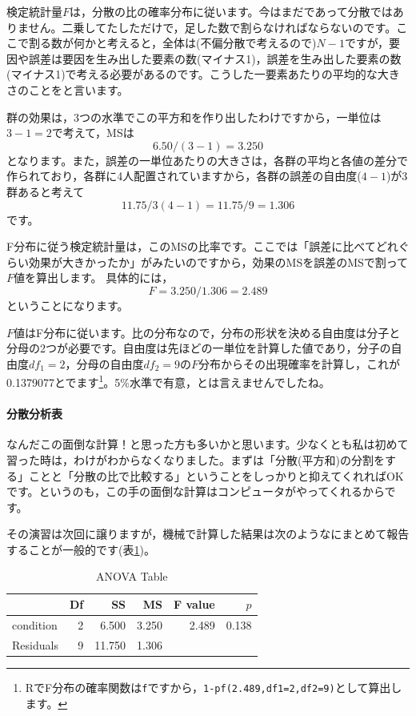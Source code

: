 \documentclass{ltjbook}
\begin{document}
検定統計量$F$は，分散の比の確率分布に従います。今はまだであって分散ではありません。二乗してたしただけで，足した数で割らなければならないのです。ここで割る数が何かと考えると，全体は(不偏分散で考えるので)$N-1$ですが，要因や誤差は要因を生み出した要素の数(マイナス1)，誤差を生み出した要素の数(マイナス1)で考える必要があるのです。こうした一要素あたりの平均的な大きさのことをと言います。

群の効果は，3つの水準でこの平方和を作り出したわけですから，一単位は$3-1=2$で考えて，MSは
\[ 6.50 / (3-1) = 3.250\]
となります。また，誤差の一単位あたりの大きさは，各群の平均と各値の差分で作られており，各群に4人配置されていますから，各群の誤差の自由度($4-1$)が3群あると考えて
\[ 11.75/3(4-1)=11.75/9 = 1.306\]
です。

F分布に従う検定統計量は，このMSの比率です。ここでは「誤差に比べてどれぐらい効果が大きかったか」がみたいのですから，効果のMSを誤差のMSで割って$F$値を算出します。
具体的には，
\[F = 3.250/1.306 = 2.489\]
ということになります。

$F$値はF分布に従います。比の分布なので，分布の形状を決める自由度は分子と分母の2つが必要です。自由度は先ほどの一単位を計算した値であり，分子の自由度$df_1 =2$，分母の自由度$df_2 = 9$の$F$分布からその出現確率を計算し，これが0.1379077とでます\footnote{RでF分布の確率関数は\texttt{f}ですから，\texttt{1-pf(2.489,df1=2,df2=9)}として算出します。}。5\%水準で有意，とは言えませんでしたね。
\paragraph{分散分析表}
なんだこの面倒な計算！と思った方も多いかと思います。少なくとも私は初めて習った時は，わけがわからなくなりました。まずは「分散(平方和)の分割をする」ことと「分散の比で比較する」ということをしっかりと抑えてくれればOKです。というのも，この手の面倒な計算はコンピュータがやってくれるからです。

その演習は次回に譲りますが，機械で計算した結果は次のようなにまとめて報告することが一般的です(表\ref{tbl::21_05})。
\begin{table}[ht]
    \centering
    \caption{ANOVA Table} 
    \begin{tabular}{lrrrrr}
      \hline
     & Df & SS & MS & F value & $p$ \\ 
      \hline
    condition   & 2 & 6.500 & 3.250 & 2.489 & 0.138 \\ 
      Residuals   & 9 & 11.750 & 1.306 &  &  \\ 
       \hline
    \end{tabular}
    \label{tbl::21_05}
    \end{table}
\end{document}
